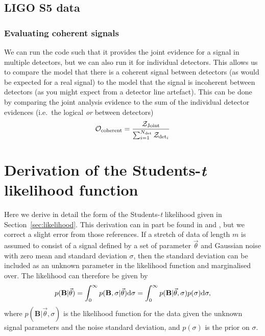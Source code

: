 \documentclass[aps,prd,showpacs,superscriptaddress,twocolumn,preprintnumbers,altaffilletter]{revtex4-1}
\begin{document}
\subsection{LIGO S5 data}

\subsubsection{Evaluating coherent signals}

We can run the code such that it provides the joint evidence for a signal in multiple detectors, but we can
also run it for individual detectors. This allows us to compare the model that there is a coherent signal
between detectors (as would be expected for a real signal) to the model that the signal is incoherent between
detectors (as you might expect from a detector line artefact). This can be done by comparing the joint
analysis evidence to the sum of the individual detector evidences (i.e.\ the logical {\it or} between
detectors)
\begin{equation}
\mathcal{O}_{\rm coherent} = \frac{\mathcal{Z}_{\rm Joint}}{\sum_{i=1}^{N_{\rm det}} \mathcal{Z}_{{\rm det}_i}}
\end{equation}

\appendix

\section{Derivation of the Students-{\it t} likelihood function}\label{app:likelihood}

Here we derive in detail the form of the Students-{\it t} likelihood given in Section~\ref{sec:likelihood}.
This derivation can in part be found in \cite{Dupuisthesis} and \cite{2005PhRvD..72j2002D}, but we correct a
slight error from those references. If a stretch of data of length $m$ is assumed to consist of a signal
defined by a set of parameter $\vec{\theta}$ and Gaussian noise with zero mean and standard deviation
$\sigma$, then the standard deviation can be included as an unknown parameter in the likelihood function and
marginalised over. The likelihood can therefore be given by
\begin{equation}\label{eq:likesigma}
p(\mathbf{B}|\vec{\theta}) = \int_0^{\infty} p(\mathbf{B},\sigma|\vec{\theta}) {\rm d}\sigma =
\int_0^{\infty} p(\mathbf{B}|\vec{\theta},\sigma)p(\sigma) {\rm d}\sigma,
\end{equation}
where $p(\mathbf{B}|\vec{\theta},\sigma)$ is the likelihood function for the data given the unknown signal
parameters and the noise standard deviation, and $p(\sigma)$ is the prior on $\sigma$.
\end{document}
